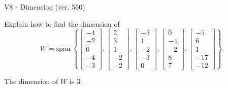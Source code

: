 \begin{exercise}
  \begin{exerciseTitle}V8 - Dimension (ver. 560)\end{exerciseTitle}
  \begin{exerciseStatement}
    Explain how to find the dimension of 
\[W=\mathrm{span}\ \left\{\left[\begin{array}{r}
-4 \\
-2 \\
0 \\
-4 \\
-3
\end{array}\right] , \left[\begin{array}{r}
2 \\
3 \\
1 \\
-2 \\
-2
\end{array}\right] , \left[\begin{array}{r}
-3 \\
1 \\
-2 \\
-3 \\
0
\end{array}\right] , \left[\begin{array}{r}
0 \\
-4 \\
-2 \\
8 \\
7
\end{array}\right] , \left[\begin{array}{r}
-5 \\
6 \\
1 \\
-17 \\
-12
\end{array}\right]\right\}.\]



  \end{exerciseStatement}
  \begin{exerciseAnswer}
   The dimension of \(W\) is  \(3\).
  


  \end{exerciseAnswer}
\end{exercise}